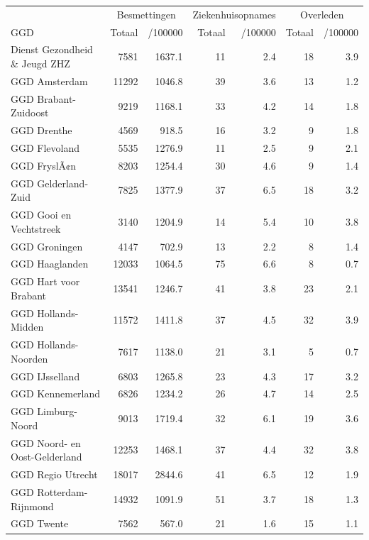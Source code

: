 \documentclass[
  english,
  man,floatsintext]{apa6}
\begin{document}
\begin{table}
\centering\begingroup\fontsize{10}{12}\selectfont

\begin{threeparttable}
\begin{tabular}{lrrrrrr}
\toprule
\multicolumn{1}{c}{ } & \multicolumn{2}{c}{Besmettingen} & \multicolumn{2}{c}{Ziekenhuisopnames} & \multicolumn{2}{c}{Overleden} \\
\cmidrule(l{3pt}r{3pt}){2-3} \cmidrule(l{3pt}r{3pt}){4-5} \cmidrule(l{3pt}r{3pt}){6-7}
GGD & Totaal & /100000 & Totaal & /100000 & Totaal & /100000\\
\midrule
Dienst Gezondheid \& Jeugd ZHZ & 7581 & 1637.1 & 11 & 2.4 & 18 & 3.9\\
GGD Amsterdam & 11292 & 1046.8 & 39 & 3.6 & 13 & 1.2\\
GGD Brabant-Zuidoost & 9219 & 1168.1 & 33 & 4.2 & 14 & 1.8\\
GGD Drenthe & 4569 & 918.5 & 16 & 3.2 & 9 & 1.8\\
GGD Flevoland & 5535 & 1276.9 & 11 & 2.5 & 9 & 2.1\\
GGD FryslÃ¢n & 8203 & 1254.4 & 30 & 4.6 & 9 & 1.4\\
GGD Gelderland-Zuid & 7825 & 1377.9 & 37 & 6.5 & 18 & 3.2\\
GGD Gooi en Vechtstreek & 3140 & 1204.9 & 14 & 5.4 & 10 & 3.8\\
GGD Groningen & 4147 & 702.9 & 13 & 2.2 & 8 & 1.4\\
GGD Haaglanden & 12033 & 1064.5 & 75 & 6.6 & 8 & 0.7\\
GGD Hart voor Brabant & 13541 & 1246.7 & 41 & 3.8 & 23 & 2.1\\
GGD Hollands-Midden & 11572 & 1411.8 & 37 & 4.5 & 32 & 3.9\\
GGD Hollands-Noorden & 7617 & 1138.0 & 21 & 3.1 & 5 & 0.7\\
GGD IJsselland & 6803 & 1265.8 & 23 & 4.3 & 17 & 3.2\\
GGD Kennemerland & 6826 & 1234.2 & 26 & 4.7 & 14 & 2.5\\
GGD Limburg-Noord & 9013 & 1719.4 & 32 & 6.1 & 19 & 3.6\\
GGD Noord- en Oost-Gelderland & 12253 & 1468.1 & 37 & 4.4 & 32 & 3.8\\
GGD Regio Utrecht & 18017 & 2844.6 & 41 & 6.5 & 12 & 1.9\\
GGD Rotterdam-Rijnmond & 14932 & 1091.9 & 51 & 3.7 & 18 & 1.3\\
GGD Twente & 7562 & 567.0 & 21 & 1.6 & 15 & 1.1\\

\end{tabular}
\end{threeparttable}
\end{table}
\end{document}
